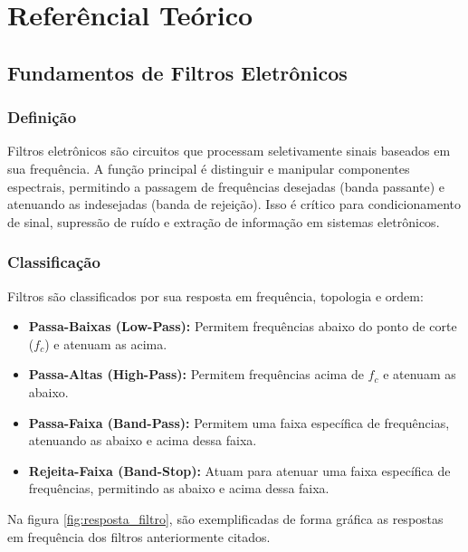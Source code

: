 \section{Referêncial Teórico}

\subsection{Fundamentos de Filtros Eletrônicos}

\subsubsection{Definição}
Filtros eletrônicos são circuitos que processam seletivamente sinais baseados em sua frequência. A função principal é distinguir e manipular componentes espectrais, permitindo a passagem de frequências desejadas (banda passante) e atenuando as indesejadas (banda de rejeição). Isso é crítico para condicionamento de sinal, supressão de ruído e extração de informação em sistemas eletrônicos.

\subsubsection{Classificação}
Filtros são classificados por sua resposta em frequência, topologia e ordem:

\begin{itemize}
    \item \textbf{Passa-Baixas (Low-Pass):} Permitem frequências abaixo do ponto de corte ($f_c$) e atenuam as acima.
    \item \textbf{Passa-Altas (High-Pass):} Permitem frequências acima de $f_c$ e atenuam as abaixo.
    \item \textbf{Passa-Faixa (Band-Pass):} Permitem uma faixa específica de frequências, atenuando as abaixo e acima dessa faixa.
    \item \textbf{Rejeita-Faixa (Band-Stop):} Atuam para atenuar uma faixa específica de frequências, permitindo as abaixo e acima dessa faixa.
\end{itemize}
Na figura \ref{fig:resposta_filtro}, são exemplificadas de forma gráfica as respostas em frequência dos filtros anteriormente citados.


